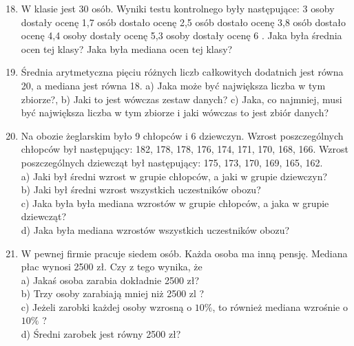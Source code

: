 \documentclass[10pt]{article}
\begin{document}
\begin{enumerate}
  \setcounter{enumi}{17}
  \item W klasie jest 30 osób. Wyniki testu kontrolnego były następujące: 3 osoby dostały ocenę 1,7 osób dostało ocenę 2,5 osób dostało ocenę 3,8 osób dostało ocenę 4,4 osoby dostały ocenę 5,3 osoby dostały ocenę 6 . Jaka była średnia ocen tej klasy? Jaka była mediana ocen tej klasy?
  \item Średnia arytmetyczna pięciu różnych liczb całkowitych dodatnich jest równa 20, a mediana jest równa 18. a) Jaka może być największa liczba w tym zbiorze?, b) Jaki to jest wówczas zestaw danych? c) Jaka, co najmniej, musi być największa liczba w tym zbiorze i jaki wówczas to jest zbiór danych?
  \item Na obozie żeglarskim było 9 chłopców i 6 dziewczyn. Wzrost poszczególnych chłopców był następujący: 182, 178, 178, 176, 174, 171, 170, 168, 166. Wzrost poszczególnych dziewcząt był następujący: 175, 173, 170, 169, 165, 162.\\
a) Jaki był średni wzrost w grupie chłopców, a jaki w grupie dziewczyn?\\
b) Jaki był średni wzrost wszystkich uczestników obozu?\\
c) Jaka była była mediana wzrostów w grupie chłopców, a jaka w grupie dziewcząt?\\
d) Jaka była mediana wzrostów wszystkich uczestników obozu?
  \item W pewnej firmie pracuje siedem osób. Każda osoba ma inną pensję. Mediana płac wynosi 2500 zł. Czy z tego wynika, że\\
a) Jakaś osoba zarabia dokładnie 2500 zł?\\
b) Trzy osoby zarabiają mniej niż 2500 zl ?\\
c) Jeżeli zarobki każdej osoby wzrosną o \(10 \%\), to również mediana wzrośnie o \(10 \%\) ?\\
d) Średni zarobek jest równy 2500 zł?
\end{enumerate}
\end{document}
